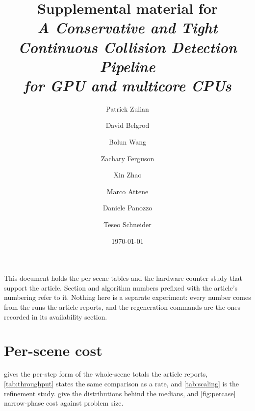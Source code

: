 

\usepackage{xr-hyper}



\title{Supplemental material for\\
       \emph{A Conservative and Tight Continuous Collision Detection Pipeline\\
       for GPU and multicore CPUs}}

\author{%
  Patrick Zulian
  \and David Belgrod
  \and Bolun Wang
  \and Zachary Ferguson
  \and Xin Zhao
  \and Marco Attene
  \and Daniele Panozzo
  \and Teseo Schneider%
}

\date{\today}


\maketitle

This document holds the per-scene tables and the hardware-counter study that
support the article. Section and algorithm numbers prefixed with the article's
numbering refer to it. Nothing here is a separate experiment: every number comes
from the runs the article reports, and the regeneration commands are the ones
recorded in its availability section.

\tableofcontents



\section{Per-scene cost}
\label{sec:supp:cost}

 gives the per-step form of the whole-scene totals the
article reports, \cref{tab:throughput} states the same comparison as a rate, and
\cref{tab:scaling} is the refinement study.  give
the distributions behind the medians, and \cref{fig:percase} narrow-phase cost
against problem size.







